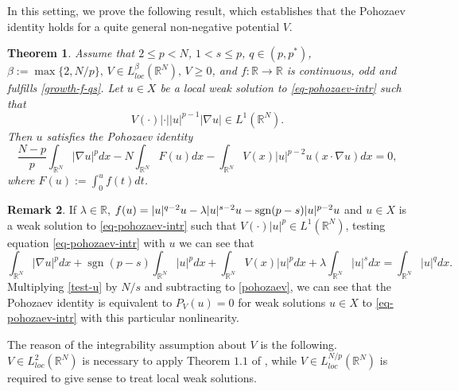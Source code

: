 \documentclass[11pt,reqno]{amsart}
\newtheorem{theorem}{Theorem}
\theoremstyle{definition}
\newtheorem{remark}[theorem]{Remark}
\numberwithin{equation}{section}
\numberwithin{theorem}{section}
\numberwithin{equation}{section}
\numberwithin{theorem}{section}
\newcommand{\sgn}{\operatorname{sgn}}
\newcommand{\R}{\mathbb{R}}
\begin{document}
In this setting, we prove the following result, which establishes that the Pohozaev identity holds for a quite general non-negative potential $V$.
\begin{theorem}\label{cor-V>0}
Assume that $2\le p<N$, $1<s\le p$, $q\in(p,p^*)$, $\beta:=\max\{2,N/p\},\,V\in L^\beta_{loc}(\R^N),\, V\ge 0$, %
and $f:\R\to\R$ is continuous, odd and fulfills \eqref{growth-f-qs}. Let $u\in X$ be a local weak solution to \eqref{eq-pohozaev-intr} such that 
\begin{equation}\label{cond-int-pot}
V(\cdotp)|\cdotp||u|^{p-1}|\nabla u|\in L^1(\R^N).    
\end{equation}
Then $u$ satisfies the Pohozaev identity 
\begin{equation}\label{pohozaev}
\frac{N-p}{p}\int_{\R^N}|\nabla u|^pdx-N\int_{\R^N}F(u) dx-\int_{\R^N}V(x)|u|^{p-2}u(x\cdotp\nabla u)dx=0, 
\end{equation}    
where $F(u):=\int_0^u f(t)dt$.
\end{theorem}
\begin{remark}
If $\lambda\in\R$, $f(u)=|u|^{q-2}u-\lambda|u|^{s-2}u-{\rm sgn}(p-s)|u|^{p-2}u$ and $u\in X$ is a weak solution to \eqref{eq-pohozaev-intr} such that $V(\cdotp)|u|^p\in L^1(\R^N)$, testing equation \eqref{eq-pohozaev-intr} with $u$ we can see that
\begin{equation}\label{test-u}
\int_{\R^N}|\nabla u|^pdx+{\sgn(p-s)}\int_{\R^N}|u|^pdx+\int_{\R^N}V(x)|u|^p dx+\lambda\int_{\R^N}|u|^s dx=\int_{\R^N}|u|^q dx.    
\end{equation}
Multiplying \eqref{test-u} by $N/s$ and subtracting to \eqref{pohozaev}, we can see that the Pohozaev identity is equivalent to $P_V(u)=0$ for weak solutions $u\in X$ to \eqref{eq-pohozaev-intr} with this particular nonlinearity.
\end{remark}
The reason of the integrability assumption about $V$ is the following. $V\in L^2_{loc}(\R^N)$ is necessary to apply Theorem $1.1$ of \cite{antonini2023interior}, while $V\in L^{N/p}_{loc}(\R^N)$ is required to give sense to treat local weak solutions.\\
\end{document}
